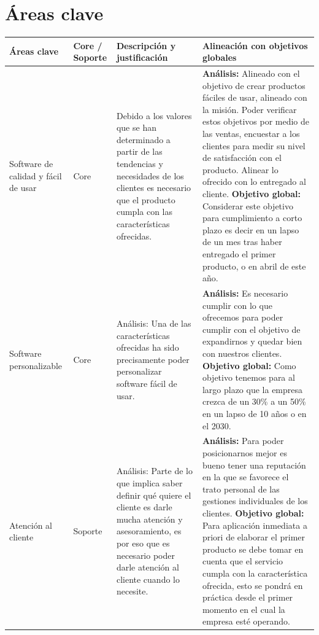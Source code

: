 \documentclass{article}
\begin{document}
\section{Áreas clave}
\begin{center}
    \begin{supertabular}{ |p{2cm}|p{2cm}|p{5cm}|p{5cm}| }
        \hline
            Áreas clave & Core / Soporte & Descripción y justificación & Alineación con objetivos globales \\
        \hline
            Software de calidad y fácil de usar & 
            Core & 
            Debido a los valores que se han determinado a partir de las tendencias y necesidades de los clientes es necesario que el producto cumpla con las características ofrecidas. & 
            \textbf{Análisis:} Alineado con el objetivo de crear productos fáciles de usar, alineado con la misión. Poder verificar estos objetivos por medio de las ventas, encuestar a los clientes para medir su nivel de satisfacción con el producto. Alinear lo ofrecido con lo entregado al cliente. \textbf{Objetivo global:} Considerar este objetivo para cumplimiento a corto plazo es decir en un lapso de un mes tras haber entregado el primer producto, o en abril de este año. \\ 
        \hline
            Software personalizable & 
            Core & 
            Análisis: Una de las características ofrecidas ha sido precisamente poder personalizar software fácil de usar. & 
            \textbf{Análisis:} Es necesario cumplir con lo que ofrecemos para poder cumplir con el objetivo de expandirnos y quedar bien con nuestros clientes. \textbf{Objetivo global:} Como objetivo tenemos para al largo plazo que la empresa crezca de un 30\% a un 50\% en un lapso de 10 años o en el 2030. \\ 
        \hline
            Atención al cliente & 
            Soporte & 
            Análisis: Parte de lo que implica saber definir qué quiere el cliente es darle mucha atención y asesoramiento, es por eso que es necesario poder darle atención al cliente cuando lo necesite. & 
            \textbf{Análisis:} Para poder posicionarnos mejor es bueno tener una reputación en la que se favorece el trato personal de las gestiones individuales de los clientes. \textbf{Objetivo global:} Para aplicación inmediata a priori de elaborar el primer producto se debe tomar en cuenta que el servicio cumpla con la característica ofrecida, esto se pondrá en práctica desde el primer momento en el cual la empresa esté operando.  \\ 

\end{supertabular}
\end{center}
\end{document}
